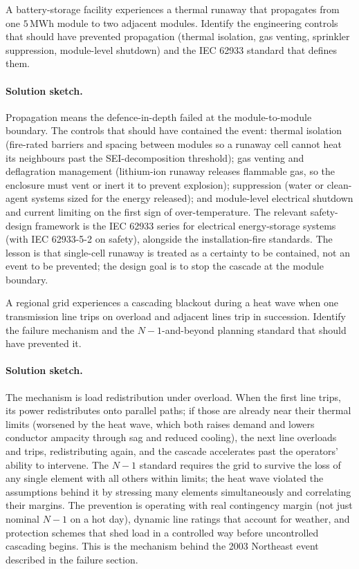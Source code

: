 \begin{exercise}
A battery-storage facility experiences a thermal runaway that
propagates from one $5\,\si{\mega\watt\hour}$ module to two adjacent
modules. Identify the engineering controls that should have
prevented propagation (thermal isolation, gas venting, sprinkler
suppression, module-level shutdown) and the IEC 62933 standard that
defines them.
\paragraph{Solution sketch.}
Propagation means the defence-in-depth failed at the module-to-module
boundary. The controls that should have contained the event: thermal
isolation (fire-rated barriers and spacing between modules so a runaway
cell cannot heat its neighbours past the SEI-decomposition threshold);
gas venting and deflagration management (lithium-ion runaway releases
flammable gas, so the enclosure must vent or inert it to prevent
explosion); suppression (water or clean-agent systems sized for the
energy released); and module-level electrical shutdown and current
limiting on the first sign of over-temperature. The relevant
safety-design framework is the IEC 62933 series for electrical
energy-storage systems (with IEC 62933-5-2 on safety), alongside the
installation-fire standards. The lesson is that single-cell runaway is
treated as a certainty to be contained, not an event to be prevented;
the design goal is to stop the cascade at the module boundary.
\end{exercise}

\begin{exercise}
A regional grid experiences a cascading blackout during a
heat wave when one transmission line trips on overload and adjacent
lines trip in succession. Identify the failure mechanism and the
$N-1$-and-beyond planning standard that should have prevented it.
\paragraph{Solution sketch.}
The mechanism is load redistribution under overload. When the first
line trips, its power redistributes onto parallel paths; if those are
already near their thermal limits (worsened by the heat wave, which both
raises demand and lowers conductor ampacity through sag and reduced
cooling), the next line overloads and trips, redistributing again, and
the cascade accelerates past the operators' ability to intervene. The
$N-1$ standard requires the grid to survive the loss of any single
element with all others within limits; the heat wave violated the
assumptions behind it by stressing many elements simultaneously and
correlating their margins. The prevention is operating with real
contingency margin (not just nominal $N-1$ on a hot day), dynamic line
ratings that account for weather, and protection schemes that shed load
in a controlled way before uncontrolled cascading begins. This is the
mechanism behind the 2003 Northeast event described in the failure
section.
\end{exercise}

